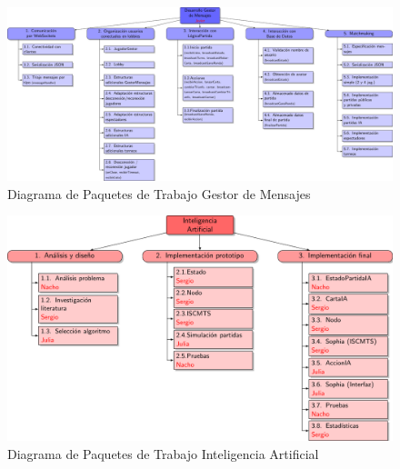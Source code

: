 \begin{figure}[H]
		\hspace{-2cm}
		\includegraphics[scale=0.6]{figuras/edtGestorMensajes.pdf}
		\caption{Diagrama de Paquetes de Trabajo Gestor de Mensajes}
	\end{figure}

\begin{figure}[H]
		\centering
		\includegraphics[scale=0.7]{figuras/edtIA.pdf}
		\caption{Diagrama de Paquetes de Trabajo Inteligencia Artificial}
	\end{figure}



